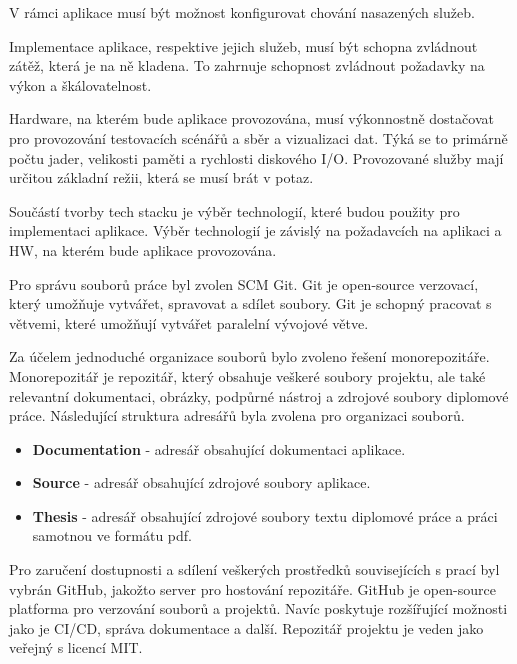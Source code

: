 V rámci aplikace musí být možnost konfigurovat chování nasazených služeb.



Implementace aplikace, respektive jejich služeb, musí být schopna zvládnout zátěž, která je na ně kladena. To zahrnuje schopnost zvládnout požadavky na výkon a škálovatelnost.


Hardware, na kterém bude aplikace provozována, musí výkonnostně dostačovat pro provozování testovacích scénářů a sběr a vizualizaci dat. Týká se to primárně počtu jader, velikosti paměti a rychlosti diskového I/O. Provozované služby mají určitou základní režii, která se musí brát v potaz.


Součástí tvorby tech stacku je výběr technologií, které budou použity pro implementaci aplikace. Výběr technologií je závislý na požadavcích na aplikaci a HW, na kterém bude aplikace provozována.


Pro správu souborů práce byl zvolen SCM Git. Git je open-source verzovací, který umožňuje vytvářet, spravovat a sdílet soubory. Git je schopný pracovat s větvemi, které umožňují vytvářet paralelní vývojové větve.

Za účelem jednoduché organizace souborů bylo zvoleno řešení monorepozitáře. Monorepozitář je repozitář, který obsahuje veškeré soubory projektu, ale také relevantní dokumentaci, obrázky, podpůrné nástroj a zdrojové soubory diplomové práce. Následující struktura adresářů byla zvolena pro organizaci souborů.

\begin{itemize}
    \item \textbf{Documentation} - adresář obsahující dokumentaci aplikace.
    \item \textbf{Source} - adresář obsahující zdrojové soubory aplikace.
    \item \textbf{Thesis} - adresář obsahující zdrojové soubory textu diplomové práce a práci samotnou ve formátu pdf.
\end{itemize}

Pro zaručení dostupnosti a sdílení veškerých prostředků souvisejících s prací byl vybrán GitHub, jakožto server pro hostování repozitáře. GitHub je open-source platforma pro verzování souborů a projektů. Navíc poskytuje rozšířující možnosti jako je CI/CD, správa dokumentace a další. Repozitář projektu je veden jako veřejný s licencí MIT.

